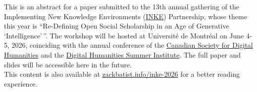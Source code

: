 \documentclass[
  canadian,
]{article}
\begin{document}
\begin{tcolorbox}[enhanced jigsaw, toptitle=1mm, titlerule=0mm, bottomtitle=1mm, colframe=quarto-callout-note-color-frame, opacitybacktitle=0.6, opacityback=0, rightrule=.15mm, colback=white, title=\textcolor{quarto-callout-note-color}{\faInfo}\hspace{0.5em}{Note}, arc=.35mm, coltitle=black, bottomrule=.15mm, left=2mm, breakable, toprule=.15mm, leftrule=.75mm, colbacktitle=quarto-callout-note-color!10!white]

This is an abstract for a paper submitted to the 13th annual gathering
of the Implementing New Knowledge Environments
(\href{https://inke.ca/}{INKE}) Partnership, whose theme this year is
``Re-Defining Open Social Scholarship in an Age of Generative
`Intelligence'\,''. The workshop will be hosted at Université de
Montréal on June 4-5, 2026, coinciding with the annual conference of the
\href{https://csdh-schn.ca/}{Canadian Society for Digital Humanities}
and the \href{https://dhsi.org/}{Digital Humanities Summer Institute}.
The full paper and slides will be accessible here in the future.\\

{This content is also available at
\href{https://zackbatist.info/inke-2026/}{zackbatist.info/inke-2026} for
a better reading experience.}

\end{tcolorbox}
\end{document}
